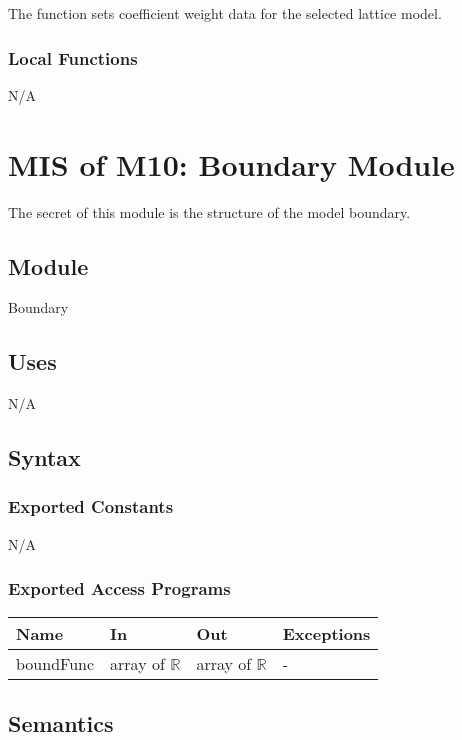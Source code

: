 \documentclass[12pt, titlepage]{article}
\begin{document}
The function sets coefficient weight data for the selected lattice model.

\subsubsection{Local Functions}
N/A

\newpage

\section{MIS of M10: Boundary Module} \label{BOModule}

The secret of this module is the structure of the model boundary.

\subsection{Module}

Boundary

\subsection{Uses}
N/A

\subsection{Syntax}

\subsubsection{Exported Constants}
N/A
\subsubsection{Exported Access Programs}

\begin{center}
	\begin{tabular}{p{2cm} p{4cm} p{4cm} p{2cm}}
		\hline
		\textbf{Name} & \textbf{In} & \textbf{Out} & \textbf{Exceptions} \\
		\hline
		boundFunc & array of $\mathbb{R}$ & array of $\mathbb{R}$ & - \\
		\hline
	\end{tabular}
\end{center}

\subsection{Semantics}
\end{document}
